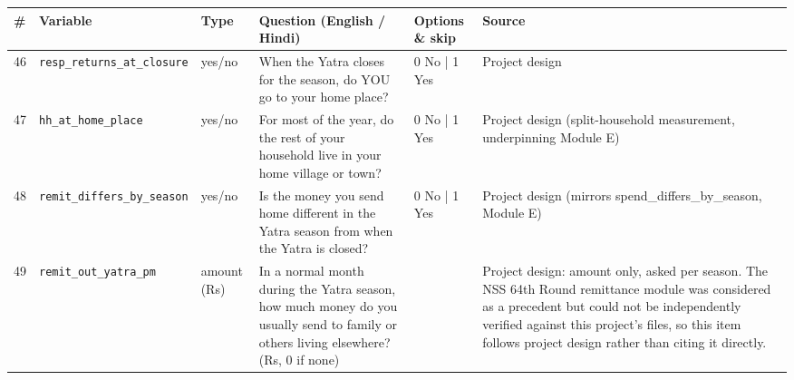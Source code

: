 \documentclass[9pt,a4paper,landscape]{article}
\begin{document}
\begin{longtable}{@{}p{0.5cm}p{3.3cm}p{1.7cm}p{7.3cm}p{5.6cm}p{5.4cm}@{}}
\toprule \footnotesize\textbf{\#} & \footnotesize\textbf{Variable} & \footnotesize\textbf{Type} & \footnotesize\textbf{Question (English / Hindi)} & \footnotesize\textbf{Options {\&} skip} & \footnotesize\textbf{Source}\\ \midrule
\endhead
\footnotesize 46 & \footnotesize\texttt{resp\_returns\_at\_closure} & \scriptsize yes/no & \footnotesize When the Yatra closes for the season, do YOU go to your home place?\par\vspace{1pt}{\footnotesize\color{hdr}{\hifont जब यात्रा का मौसम ख़त्म हो जाता है, तो क्या आप अपने घर चले जाते हैं?}} & \scriptsize 0 No | 1 Yes & \scriptsize Project design\\
\footnotesize 47 & \footnotesize\texttt{hh\_at\_home\_place} & \scriptsize yes/no & \footnotesize For most of the year, do the rest of your household live in your home village or town?\par\vspace{1pt}{\footnotesize\color{hdr}{\hifont साल के ज़्यादातर समय, क्या आपके घर के बाक़ी लोग आपके गाँव या शहर में ही रहते हैं?}} & \scriptsize 0 No | 1 Yes & \scriptsize Project design (split-household measurement, underpinning Module E)\\
\footnotesize 48 & \footnotesize\texttt{remit\_differs\_by\_season} & \scriptsize yes/no & \footnotesize Is the money you send home different in the Yatra season from when the Yatra is closed?\par\vspace{1pt}{\footnotesize\color{hdr}{\hifont यात्रा के सीज़न में आप घर जो पैसा भेजते हैं, वह यात्रा बंद रहने के महीनों से अलग होता है?}} & \scriptsize 0 No | 1 Yes & \scriptsize Project design (mirrors spend\_differs\_by\_season, Module E)\\
\footnotesize 49 & \footnotesize\texttt{remit\_out\_yatra\_pm} & \scriptsize amount (Rs) & \footnotesize In a normal month during the Yatra season, how much money do you usually send to family or others living elsewhere? (Rs, 0 if none)\par\vspace{1pt}{\footnotesize\color{hdr}{\hifont यात्रा के मौसम के आम महीने में, आप घर या कहीं और रहने वालों को कितना पैसा भेजते हैं? (रुपये, न भेजते हों तो 0)}} & \scriptsize  & \scriptsize Project design: amount only, asked per season. The NSS 64th Round remittance module was considered as a precedent but could not be independently verified against this project's files, so this item follows project design rather than citing it directly.\\

\end{longtable}
\end{document}
